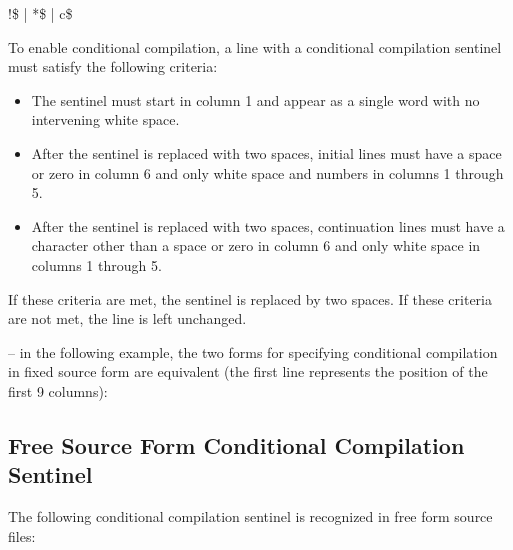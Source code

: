 \begin{boxedcode}
!\$ \textnormal{|} *\$ \textnormal{|} c\$
\end{boxedcode}

To enable conditional compilation, a line with a conditional compilation sentinel must 
satisfy the following criteria: 

\begin{itemize}
\item The sentinel must start in column 1 and appear as a single word with no intervening 
white space. 

\item After the sentinel is replaced with two spaces, initial lines must have a space or zero 
in column 6 and only white space and numbers in columns 1 through 5.

\item After the sentinel is replaced with two spaces, continuation lines must have a 
character other than a space or zero in column 6 and only white space in columns 1 
through 5.
\end{itemize}

If these criteria are met, the sentinel is replaced by two spaces. If these criteria are not 
met, the line is left unchanged.
\begin{figure}[t!]
\end{figure}

\notestart
\noteheader – in the following example, the two forms for specifying conditional compilation 
in fixed source form are equivalent (the first line represents the position of the first 9 
columns):

\begin{alltt}
\end{alltt}
\noteend







\subsection{Free Source Form Conditional Compilation Sentinel}
\label{subsec:Free Source Form Conditional Compilation Sentinel}
The following conditional compilation sentinel is recognized in free form source files:

